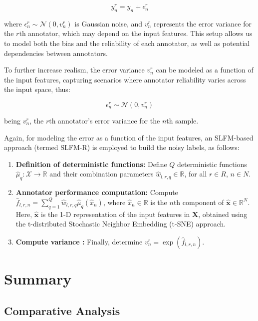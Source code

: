 \[
y_n^{r} = y_n + \epsilon_n^{r}
\]

where $\epsilon_n^{r} \sim \mathcal{N}(0, v_n^{r})$ is Gaussian
noise, and $v_n^{r}$ represents the error variance for the $r$th
annotator, which may depend on the input features. This setup allows
us to model both the bias and the reliability of each annotator, as
well as potential dependencies between annotators.

To further increase realism, the error variance $v_n^{r}$ can be
modeled as a function of the input features, capturing scenarios
where annotator reliability varies across the input space, thus:

\[
\epsilon_n^r \sim \mathcal{N}(0, v_n^r)
\]

being $v_n^r$, the $r$th annotator's error variance for the $n$th sample.

Again, for modeling the error as a function of the input features,
an \gls{SLFM}-based approach (termed SLFM-R) is employed to build the
noisy labels, as follows:

\begin{enumerate}
\item \textbf{Definition of deterministic functions:} Define $Q$
deterministic functions $\hat{\mu}_q : \mathcal{X} \rightarrow
\mathbb{R}$ and their combination parameters $\hat{w}_{l,r,q} \in
\mathbb{R}$, for all $r \in R$, $n \in N$.
\item \textbf{Annotator performance computation:} Compute
$\hat{f}_{l,r,n} = \sum_{q=1}^{Q} \hat{w}_{l,r,q}
\hat{\mu}_q(\hat{x}_n)$, where $\hat{x}_n \in \mathbb{R}$ is the
$n$th component of $\hat{\mathbf{x}} \in \mathbb{R}^N$. Here,
$\hat{\mathbf{x}}$ is the 1-D representation of the input features in
$\mathbf{X}$, obtained using the t-distributed Stochastic Neighbor
Embedding (t-SNE) approach.
\item \textbf{Compute variance :} Finally, determine
$v_n^r=\exp(\hat{f}_{l,r,n})$.
\end{enumerate}

\section{Summary}\label{sec:summary}
\subsection{Comparative Analysis}

